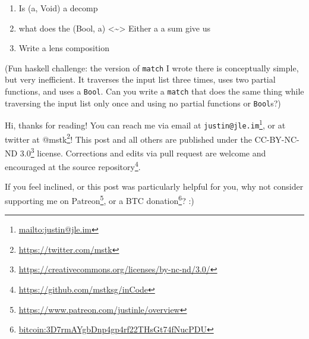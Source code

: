 \documentclass[]{article}
\renewcommand{\href}[2]{#2\footnote{\url{#1}}}
\begin{document}
\begin{enumerate}
\def\labelenumi{\arabic{enumi}.}
\tightlist
\item
  Is (a, Void) a decomp
\item
  what does the (Bool, a) \textless{}\textasciitilde{}\textgreater{} Either a a
  sum give us
\item
  Write a lens composition
\end{enumerate}

(Fun haskell challenge: the version of \texttt{match} I wrote there is
conceptually simple, but very inefficient. It traverses the input list three
times, uses two partial functions, and uses a \texttt{Bool}. Can you write a
\texttt{match} that does the same thing while traversing the input list only
once and using no partial functions or \texttt{Bool}s?)

Hi, thanks for reading! You can reach me via email at
\href{mailto:justin@jle.im}{\nolinkurl{justin@jle.im}}, or at twitter at
\href{https://twitter.com/mstk}{@mstk}! This post and all others are published
under the \href{https://creativecommons.org/licenses/by-nc-nd/3.0/}{CC-BY-NC-ND
3.0} license. Corrections and edits via pull request are welcome and encouraged
at \href{https://github.com/mstksg/inCode}{the source repository}.

If you feel inclined, or this post was particularly helpful for you, why not
consider \href{https://www.patreon.com/justinle/overview}{supporting me on
Patreon}, or a \href{bitcoin:3D7rmAYgbDnp4gp4rf22THsGt74fNucPDU}{BTC donation}?
:)
\end{document}
